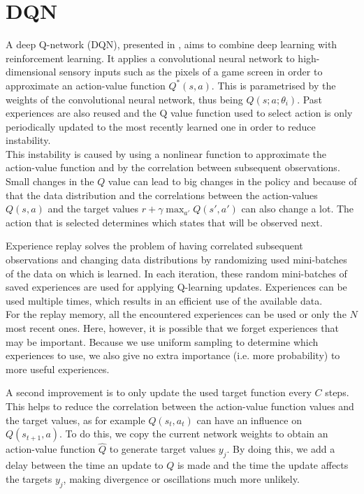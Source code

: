 \documentclass[a4paper, 11pt]{article}
\begin{document}
\section{DQN}
A deep Q-network (DQN), presented in \cite{Mnih2015Human-levelLearning}, aims to combine deep learning with reinforcement learning. It applies a convolutional neural network to high-dimensional sensory inputs such as the pixels of a game screen in order to approximate an action-value function $Q^{*}(s,a)$. This is parametrised by the weights of the convolutional neural network, thus being $Q(s;a;\theta_i)$. Past experiences are also reused and the Q value function used to select action is only periodically updated to the most recently learned one in order to reduce instability.\\

This instability is caused by using a nonlinear function to approximate the action-value function and by the correlation between subsequent observations. Small changes in the $Q$ value can lead to big changes in the policy and because of that the data distribution and the correlations between the action-values $Q(s,a)$ and the target values $r+\gamma \max_{a'} Q(s',a')$ can also change a lot. The action that is selected determines which states that will be observed next.

Experience replay solves the problem of having correlated subsequent observations and changing data distributions by randomizing used mini-batches of the data on which is learned. In each iteration, these random mini-batches of saved experiences are used for applying Q-learning updates. Experiences can be used multiple times, which results in an efficient use of the available data.\\
For the replay memory, all the encountered experiences can be used or only the $N$ most recent ones. Here, however, it is possible that we forget experiences that may be important. Because we use uniform sampling to determine which experiences to use, we also give no extra importance (i.e. more probability) to more useful experiences.

A second improvement is to only update the used target function every $C$ steps. This helps to reduce the correlation between the action-value function values and the target values, as for example $Q(s_t, a_t)$ can have an influence on $Q(s_{t+1},a)$. To do this, we copy the current network weights to obtain an action-value function $\hat{Q}$ to generate target values $y_j$. By doing this, we add a delay between the time an update to $Q$ is made and the time the update affects the targets $y_j$, making divergence or oscillations much more unlikely.
\end{document}
